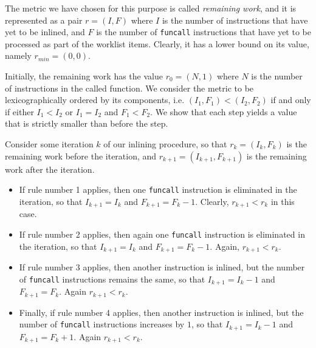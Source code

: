 The metric we have chosen for this purpose is called \emph{remaining
  work}, and it is represented as a pair $r = (I,F)$ where $I$ is the
number of instructions that have yet to be inlined, and $F$ is the
number of \texttt{funcall} instructions that have yet to be processed
as part of the worklist items.  Clearly, it has a lower bound on its
value, namely $r_{min} = (0,0)$.

Initially, the remaining work has the value $r_0 = (N,1)$ where $N$ is
the number of instructions in the called function.  We consider the
metric to be lexicographically ordered by its components, i.e. $(I_1,
F_1) < (I_2, F_2)$ if and only if either $I_1 < I_2$ or $I_1 = I_2$
and $F_1 < F_2$.  We show that each step yields a value that is
strictly smaller than before the step.

Consider some iteration $k$ of our inlining procedure, so that $r_k =
(I_k,F_k)$ is the remaining work before the iteration, and $r_{k+1} =
(I_{k+1},F_{k+1})$ is the remaining work after the iteration.

\begin{itemize}
\item If rule number 1 applies, then one \texttt{funcall} instruction
  is eliminated in the iteration, so that $I_{k+1} = I_k$ and $F_{k+1}
  = F_k-1$.  Clearly, $r_{k+1} < r_k$ in this case.
\item If rule number 2 applies, then again one \texttt{funcall}
  instruction is eliminated in the iteration, so that $I_{k+1} = I_k$
  and $F_{k+1} = F_k-1$.  Again, $r_{k+1} < r_k$.
\item If rule number 3 applies, then another instruction is inlined,
  but the number of \texttt{funcall} instructions remains the same, so
  that $I_{k+1} = I_k-1$ and $F_{k+1} = F_k$.  Again $r_{k+1} < r_k$.
\item Finally, if rule number 4 applies, then another instruction is inlined,
  but the number of \texttt{funcall} instructions increases by $1$, so
  that $I_{k+1} = I_k-1$ and $F_{k+1} = F_k+1$.  Again $r_{k+1} < r_k$.
\end{itemize}

